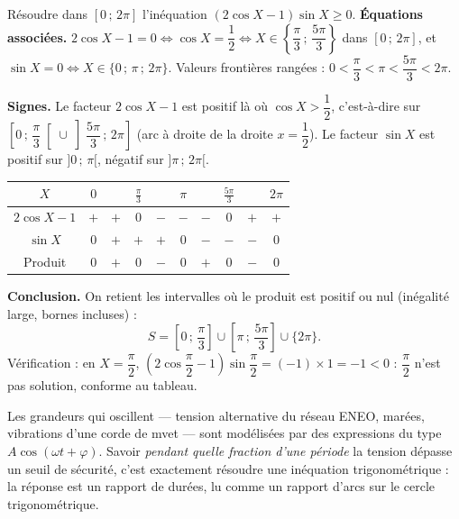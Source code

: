 \documentclass[11pt]{article}
\begin{document}
\begin{exoresolu}
Résoudre dans $[0\,;\,2\pi]$ l'inéquation $(2\cos X - 1)\sin X \geq 0$.
\tcblower
\textbf{Équations associées.} $2\cos X - 1 = 0 \iff \cos X = \dfrac{1}{2} \iff X \in \left\{\dfrac{\pi}{3}\,;\,\dfrac{5\pi}{3}\right\}$ dans $[0\,;\,2\pi]$, et $\sin X = 0 \iff X \in \{0\,;\,\pi\,;\,2\pi\}$. Valeurs frontières rangées : $0 < \dfrac{\pi}{3} < \pi < \dfrac{5\pi}{3} < 2\pi$.

\textbf{Signes.} Le facteur $2\cos X - 1$ est positif là où $\cos X > \dfrac{1}{2}$, c'est-à-dire sur $\left[0\,;\,\dfrac{\pi}{3}\right[ \cup \left]\dfrac{5\pi}{3}\,;\,2\pi\right]$ (arc à droite de la droite $x = \dfrac12$). Le facteur $\sin X$ est positif sur $]0\,;\,\pi[$, négatif sur $]\pi\,;\,2\pi[$.

\begin{center}
\begin{tabular}{|c|ccccccccc|}\hline
$X$ & $0$ & & $\frac{\pi}{3}$ & & $\pi$ & & $\frac{5\pi}{3}$ & & $2\pi$ \\ \hline
$2\cos X - 1$ & $+$ & $+$ & $0$ & $-$ & $-$ & $-$ & $0$ & $+$ & $+$ \\ \hline
$\sin X$ & $0$ & $+$ & $+$ & $+$ & $0$ & $-$ & $-$ & $-$ & $0$ \\ \hline
Produit & $0$ & $+$ & $0$ & $-$ & $0$ & $+$ & $0$ & $-$ & $0$ \\ \hline
\end{tabular}
\end{center}

\textbf{Conclusion.} On retient les intervalles où le produit est positif ou nul (inégalité large, bornes incluses) :
\[ S = \left[0\,;\,\dfrac{\pi}{3}\right] \cup \left[\pi\,;\,\dfrac{5\pi}{3}\right] \cup \{2\pi\}. \]
Vérification : en $X = \dfrac{\pi}{2}$, $\left(2\cos\dfrac{\pi}{2}-1\right)\sin\dfrac{\pi}{2} = (-1)\times 1 = -1 < 0$ : $\dfrac{\pi}{2}$ n'est pas solution, conforme au tableau.
\end{exoresolu}

\begin{savaistu}
Les grandeurs qui oscillent — tension alternative du réseau ENEO, marées, vibrations d'une corde de mvet — sont modélisées par des expressions du type $A\cos(\omega t + \varphi)$. Savoir \emph{pendant quelle fraction d'une période} la tension dépasse un seuil de sécurité, c'est exactement résoudre une inéquation trigonométrique : la réponse est un rapport de durées, lu comme un rapport d'arcs sur le cercle trigonométrique.
\end{savaistu}
\end{document}
